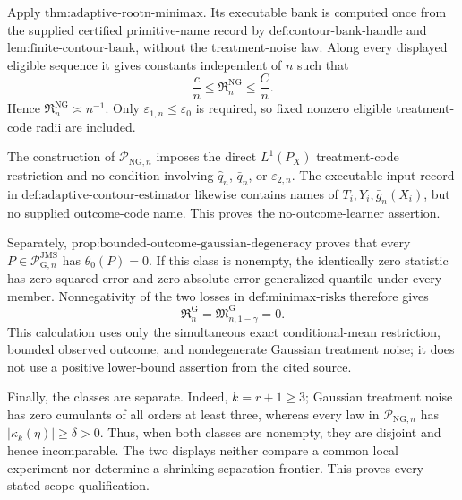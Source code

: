 Apply \(\text{thm:adaptive-rootn-minimax}\).  Its executable bank is computed once from the supplied certified primitive-name record by \(\text{def:contour-bank-handle}\) and \(\text{lem:finite-contour-bank}\), without the treatment-noise law.  Along every displayed eligible sequence it gives constants independent of \(n\) such that
\[
 \frac cn\le\mathfrak R_n^{\mathrm{NG}}\le\frac Cn.
\]
Hence \(\mathfrak R_n^{\mathrm{NG}}\asymp n^{-1}\).  Only \(\varepsilon_{1,n}\le\varepsilon_0\) is required, so fixed nonzero eligible treatment-code radii are included.

The construction of \(\mathcal P_{\mathrm{NG},n}\) imposes the direct \(L^1(P_X)\) treatment-code restriction and no condition involving \(\widehat q_n\), \(\bar q_n\), or \(\varepsilon_{2,n}\).  The executable input record in \(\text{def:adaptive-contour-estimator}\) likewise contains names of \(T_i,Y_i,\bar g_n(X_i)\), but no supplied outcome-code name.  This proves the no-outcome-learner assertion.

Separately, \(\text{prop:bounded-outcome-gaussian-degeneracy}\) proves that every \(P\in\mathcal P_{\mathrm G,n}^{\mathrm{JMS}}\) has \(\theta_0(P)=0\).  If this class is nonempty, the identically zero statistic has zero squared error and zero absolute-error generalized quantile under every member.  Nonnegativity of the two losses in \(\text{def:minimax-risks}\) therefore gives
\[
 \mathfrak R_n^{\mathrm G}
 =\mathfrak M_{n,1-\gamma}^{\mathrm G}=0.
\]
This calculation uses only the simultaneous exact conditional-mean restriction, bounded observed outcome, and nondegenerate Gaussian treatment noise; it does not use a positive lower-bound assertion from the cited source.

Finally, the classes are separate.  Indeed, \(k=r+1\ge3\); Gaussian treatment noise has zero cumulants of all orders at least three, whereas every law in \(\mathcal P_{\mathrm{NG},n}\) has \(|\kappa_k(\eta)|\ge\delta>0\).  Thus, when both classes are nonempty, they are disjoint and hence incomparable.  The two displays neither compare a common local experiment nor determine a shrinking-separation frontier.  This proves every stated scope qualification.